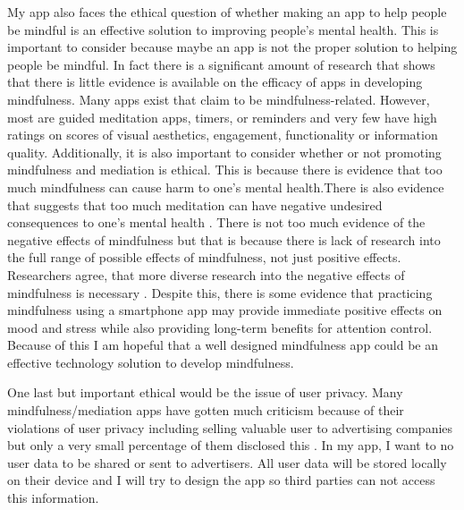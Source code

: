 \documentclass[12pt,twocolumn]{article}
\begin{document}
My app also faces the ethical question of whether making an app to help people be mindful is an effective solution to improving people’s mental health. This is important to consider because maybe an app is not the proper solution to helping people be mindful. In fact there is a significant amount of research that shows that there is little evidence is available on the efficacy of apps in developing mindfulness. Many apps exist that claim to be mindfulness-related. However, most are guided meditation apps, timers, or reminders and very few have high ratings on scores of visual aesthetics, engagement, functionality or information quality\cite{Mani2015ReviewAE}. Additionally, it is also important to consider whether or not promoting mindfulness and mediation is ethical. This is because there is evidence that too much mindfulness can cause harm to one's mental health\cite{Britton2019CanMB}.There is also evidence that suggests that too much meditation can have negative undesired consequences to one's mental health \cite{Cebolla2017}. There is not too much evidence of the negative effects of mindfulness but that is because there is lack of research into the full range of possible effects of mindfulness, not just positive effects. Researchers agree, that more diverse research into the negative effects of mindfulness is necessary \cite{Britton2019CanMB}.  Despite this, there is some evidence that practicing mindfulness using a smartphone app may provide immediate positive effects on mood and stress while also providing long-term benefits for attention control. Because of this I am hopeful that a well designed mindfulness app could be an effective technology solution to develop mindfulness\cite{Walsh2019EffectsOA}.

One last but important ethical would be the issue of user privacy. Many mindfulness/mediation apps have gotten much criticism because of their violations of user privacy including selling valuable user to advertising companies but only a very small percentage of them disclosed this \cite{Huckvale2019}. In my app, I want to no user data to be shared or sent to advertisers. All user data will be stored locally on their device and I will try to design the app so third parties can not access this information. 
\end{document}
